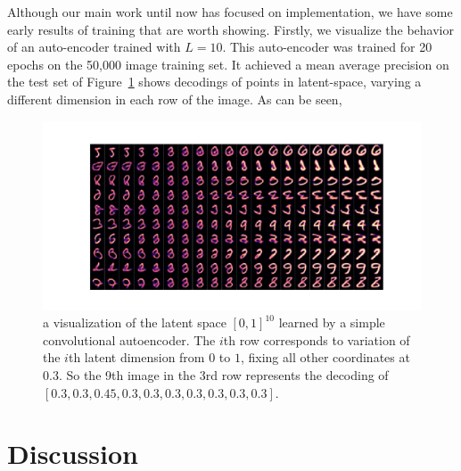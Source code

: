 \documentclass[a4paper]{article}
\begin{document}
Although our main work until now has focused on implementation, we have some
early results of training that are worth showing. Firstly, we visualize the
behavior of an auto-encoder trained with $L = 10$. This auto-encoder was trained
for 20 epochs on the 50,000 image training set. It achieved a mean average
precision on the test set of 
Figure~\ref{fig:autoencoder-visualization} shows decodings of points in
latent-space, varying a different dimension in each row of the image. As can be
seen,

\begin{figure}
  \centering
  \includegraphics[width=\linewidth]{visualize_decoding}
  \caption{a visualization of the latent space $[0,1]^{10}$ learned by a simple
    convolutional autoencoder. The $i$th row corresponds to variation of the
    $i$th latent dimension from $0$ to $1$, fixing all other coordinates at
    $0.3$. So the 9th image in the 3rd row represents the decoding of
    $[0.3,0.3,0.45,0.3,0.3,0.3,0.3,0.3,0.3,0.3]$.}
  \label{fig:autoencoder-visualization}
\end{figure}


\section{Discussion}
\label{sec:discussion}
  




\newpage
\eightpt



\end{document}
